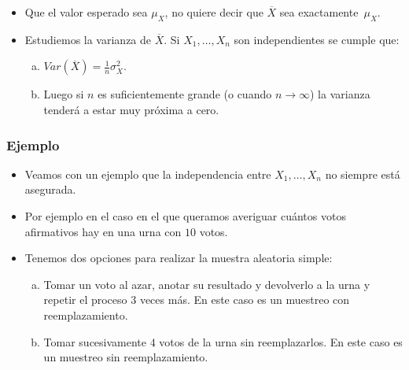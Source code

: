 \begin{frame}
\begin{itemize}
\item  Que el valor esperado sea $\mu_{X}$, no quiere decir que $\overline{X}$ sea exactamente~$\mu_{X}$. 
\item  Estudiemos la varianza de $\overline{X}$. Si  $X_{1},\ldots,X_{n}$ son independientes se cumple que:
\begin {enumerate}[a)]
\item $Var(\overline{X})=\frac{1}{n} \sigma_{X}^2$.
\item Luego  si $n$ es suficientemente grande (o cuando $n\to\infty$) la varianza tenderá a estar muy próxima a cero.
\end{enumerate}
\end{itemize}
\end{frame}

\begin{frame}
\frametitle{Ejemplo}
\begin{itemize}
\item 
Veamos con un ejemplo que la independencia entre $X_{1},\ldots,X_{n}$ no siempre está asegurada.
\item  Por ejemplo  en el caso en el  que queramos averiguar cuántos votos
 afirmativos hay en una urna con $10$ votos.
\item  Tenemos dos opciones para realizar la muestra aleatoria simple:
 \begin{enumerate}[a)]
 \item Tomar un voto al azar, anotar su resultado y devolverlo a la urna y
 repetir el proceso $3$ veces más. En este caso es un muestreo con reemplazamiento.
 \item Tomar sucesivamente $4$ votos de la urna sin reemplazarlos.
 En este caso es un muestreo  sin reemplazamiento.
 \end{enumerate}
\end{itemize}
\end{frame}

